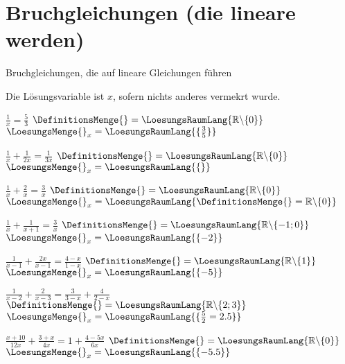 

\renewcommand{\bbwAufgabenBlockID}{GL\_Br}



\usepackage{amssymb} %
\renewcommand{\metaHeaderLine}{Arbeitsblatt}
\renewcommand{\arbeitsblattTitel}{Bruchgleichungen}

\arbeitsblattHeader{}

\section{Bruchgleichungen (die lineare werden)}
Bruchgleichungen, die auf lineare Gleichungen führen

Die Lösungsvariable ist $x$, sofern nichts anderes vermekrt wurde.


\begin{bbwAufgabenBlock}
\item $\frac1x = \frac53$     \hspace{10mm}              $\DefinitionsMenge{}= \LoesungsRaumLang{\mathbb{R}\backslash\{0\}}$    $\LoesungsMenge{}_x = \LoesungsRaumLang{\{\frac35\}}$
\item $\frac1x + \frac1{2x} = \frac1{3x}$ \hspace{10mm}   $\DefinitionsMenge{}= \LoesungsRaumLang{\mathbb{R}\backslash\{0\}}$    $\LoesungsMenge{}_x = \LoesungsRaumLang{\{\}}$\noTRAINER{\newpage}
\item $\frac1x + \frac2x = \frac3x$  \hspace{10mm}       $\DefinitionsMenge{}= \LoesungsRaumLang{\mathbb{R}\backslash\{0\}}$    $\LoesungsMenge{}_x = \LoesungsRaumLang{\DefinitionsMenge{}=\mathbb{R}\backslash\{0\}}$
\item $\frac1x + \frac1{x+1} = \frac3x$ \hspace{10mm}    $\DefinitionsMenge{}= \LoesungsRaumLang{\mathbb{R}\backslash\{-1;0\}}$ $\LoesungsMenge{}_x = \LoesungsRaumLang{\{-2\}}$
\item $\frac1{x-1} + \frac{2x}{x-1} = \frac{4-x}{1-x}$ \hspace{10mm}    $\DefinitionsMenge{}= \LoesungsRaumLang{\mathbb{R}\backslash\{1\}}$ $\LoesungsMenge{}_x = \LoesungsRaumLang{\{-5\}}$\noTRAINER{\newpage}
\item $\frac1{x-2} + \frac{2}{x-3} = \frac3{3-x} + \frac{4}{2-x}$ \hspace{10mm}    $\DefinitionsMenge{}= \LoesungsRaumLang{\mathbb{R}\backslash\{2;3\}}$ $\LoesungsMenge{}_x = \LoesungsRaumLang{\{\frac{5}{2}=2.5\}}$
\item $\frac{x+10}{12x} + \frac{3+x}{4x} = 1 + \frac{4-5x}{6x}$ \hspace{10mm}    $\DefinitionsMenge{}= \LoesungsRaumLang{\mathbb{R}\backslash\{0\}}$ $\LoesungsMenge{}_x = \LoesungsRaumLang{\{-5.5\}}$
\end{bbwAufgabenBlock}

